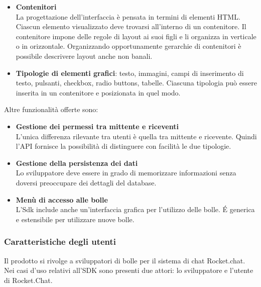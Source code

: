 \begin{itemize}
\item \textbf{Contenitori}\\
  La progettazione dell'interfaccia è pensata in termini di
  elementi HTML. Ciascun elemento visualizzato deve trovarsi
  all'interno di un contenitore. Il contenitore impone delle regole
  di layout ai suoi figli e li organizza in verticale o in
  orizzontale. Organizzando opportunamente gerarchie di contenitori
  è possibile descrivere layout anche non banali.
\item \textbf{Tipologie di elementi grafici}: testo, immagini, campi
  di inserimento di testo, pulsanti, checkbox, radio buttons,
  tabelle. Ciascuna tipologia può essere inserita in un contenitore e
  posizionata in quel modo.

\end{itemize} %

Altre funzionalità offerte sono:
\begin{itemize}

\item \textbf{Gestione dei permessi tra mittente e riceventi}\\
L'unica differenza rilevante tra utenti è quella tra mittente e
ricevente. Quindi l'API fornisce  la possibilità di distinguere con
facilità le due tipologie.

\item \textbf{Gestione della persistenza dei dati} \\
Lo sviluppatore deve essere in grado di memorizzare informazioni senza
doversi preoccupare dei dettagli del database.

\item \textbf{Menù di accesso alle bolle}\\
L'Sdk include anche un'interfaccia grafica per l'utilizzo delle
bolle. \'E generica e estensibile per utilizzare nuove bolle.
\end{itemize}






\subsubsection{Caratteristiche degli utenti}
Il prodotto si rivolge a sviluppatori di bolle per il sistema di chat
Rocket.chat.
Nei casi d'uso relativi all'SDK sono presenti due attori: lo
sviluppatore e l'utente di Rocket.Chat.

